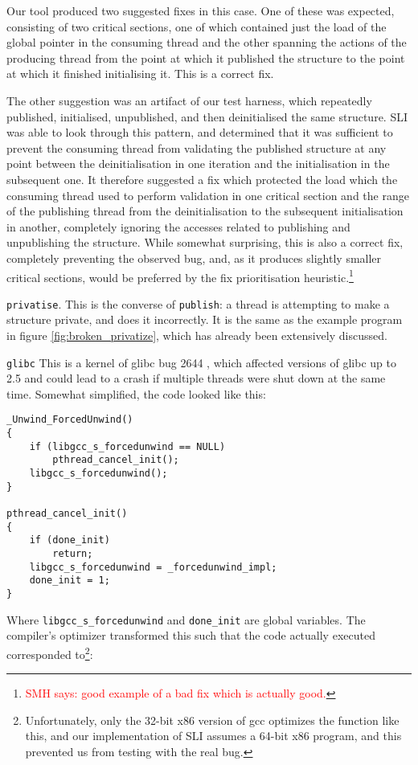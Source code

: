 \documentclass[10pt,twocolumn,preprint,natbib,authoryear]{sigplanconf}
\newcommand{\editorial}[1]{\textcolor{red}{\footnote{\textcolor{red}{#1}}}}
\newcommand{\smh}[1]{\editorial{SMH says: #1}}
\begin{document}
Our tool produced two suggested fixes in this case.  One of these was
expected, consisting of two critical sections, one of which contained
just the load of the global pointer in the consuming thread and the
other spanning the actions of the producing thread from the point at
which it published the structure to the point at which it finished
initialising it.  This is a correct fix.

The other suggestion was an artifact of our test harness, which
repeatedly published, initialised, unpublished, and then deinitialised
the same structure.  SLI was able to look through this pattern, and
determined that it was sufficient to prevent the consuming thread from
validating the published structure at any point between the
deinitialisation in one iteration and the initialisation in the
subsequent one.  It therefore suggested a fix which protected the load
which the consuming thread used to perform validation in one critical
section and the range of the publishing thread from the
deinitialisation to the subsequent initialisation in another,
completely ignoring the accesses related to publishing and
unpublishing the structure.  While somewhat surprising, this is also a
correct fix, completely preventing the observed bug, and, as it
produces slightly smaller critical sections, would be preferred by the
fix prioritisation heuristic.\smh{good example of a bad fix which is
  actually good.}

\verb|privatise|.  This is the converse of \verb|publish|: a thread is
attempting to make a structure private, and does it incorrectly.  It
is the same as the example program in figure
\ref{fig:broken_privatize}, which has already been extensively
discussed.

\verb|glibc| This is a kernel of glibc bug 2644 \cite{glibc2644},
which affected versions of glibc up to 2.5 and could lead to a crash
if multiple threads were shut down at the same time.  Somewhat
simplified, the code looked like this:

\begin{verbatim}
_Unwind_ForcedUnwind()
{
    if (libgcc_s_forcedunwind == NULL)
        pthread_cancel_init();
    libgcc_s_forcedunwind();
}

pthread_cancel_init()
{
    if (done_init)
        return;
    libgcc_s_forcedunwind = _forcedunwind_impl;
    done_init = 1;
}
\end{verbatim}

Where \verb|libgcc_s_forcedunwind| and \verb|done_init| are global
variables.  The compiler's optimizer transformed this such that the
code actually executed corresponded to\footnote{Unfortunately, only
  the 32-bit x86 version of gcc optimizes the function like this, and
  our implementation of SLI assumes a 64-bit x86 program, and this
  prevented us from testing with the real bug.}:
\end{document}
